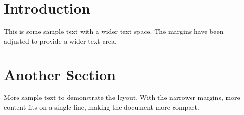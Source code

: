 \documentclass{article}
\begin{document}
	
	\section{Introduction}
	This is some sample text with a wider text space. The margins have been adjusted to provide a wider text area.
	
	\lipsum[1-4] %
	
	\section{Another Section}
	More sample text to demonstrate the layout. With the narrower margins, more content fits on a single line, making the document more compact.
	
	\lipsum[5-8] %
	
\end{document}
